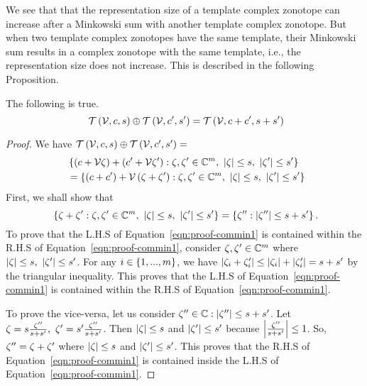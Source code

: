 %
We see that that the representation size of a template complex
zonotope can increase after a Minkowski sum with another template
complex zonotope.  But when two template complex
zonotopes have the same template, their Minkowski sum results in a
complex zonotope with the same template, i.e., the representation size
does not increase.  This is described in the following Proposition.
%
\begin{proposition}
The following is true.
%
\begin{equation}~\label{eqn:common-minkowski}
\mathit{\operatorname{\mathcal{T}}}\left(\mathcal{V},c,s\right)\oplus \mathit{\operatorname{\mathcal{T}}}\left(\mathcal{V},c^\prime,s^\prime\right)=\mathit{\operatorname{\mathcal{T}}}\left(\mathcal{V},c+c^\prime,s+s^\prime\right)
\end{equation}
%
\end{proposition}
%
\begin{proof}
We have $\mathit{\operatorname{\mathcal{T}}}\left(\mathcal{V},c,s\right)\oplus \mathit{\operatorname{\mathcal{T}}}\left(\mathcal{V},c^\prime,s^\prime\right)=$
%
\begin{align}~\label{eqn:proof-commin2}
&
\left\{\left(c+\mathcal{V}\zeta\right)+\left(c^\prime+\mathcal{V}\zeta^\prime\right):\zeta,\zeta^\prime\in\mathbb{C}^m,~\left|\zeta\right|\leq
s,~\left|\zeta^\prime\right|\leq s^\prime\right\}\nonumber\\
& = \left\{\left(c+c^\prime\right)+\mathcal{V}\left(\zeta+\zeta^\prime\right):\zeta,\zeta^\prime\in\mathbb{C}^m,~\left|\zeta\right|\leq
s,~\left|\zeta^\prime\right|\leq s^\prime\right\}
\end{align}
%
First, we shall show that
\begin{equation}~\label{eqn:proof-commin1}
\left\{\zeta+\zeta^\prime:\zeta,\zeta^\prime\in\mathbb{C}^m,~\left|\zeta\right|\leq
s,~\left|\zeta^\prime\right|\leq s^\prime\right\}=\left\{\zeta^{\prime\prime}:\left|\zeta^{\prime\prime}\right|\leq s+s^\prime \right\}.
\end{equation}
%
To prove that the L.H.S of Equation~\ref{eqn:proof-commin1} is
contained within the R.H.S of Equation~\ref{eqn:proof-commin1},
consider $\zeta,\zeta^\prime\in\mathbb{C}^m$ where $\left|\zeta\right|\leq
s,~\left|\zeta^\prime\right|\leq s^\prime$.  For any
$i\in\left\{1,...,m\right\}$, we have
$\left|\zeta_i+\zeta^\prime_i\right|\leq \left|\zeta_i\right|+\left|\zeta^\prime_i\right|=s+s^\prime$
by the triangular inequality.  This proves that the L.H.S of
Equation~\ref{eqn:proof-commin1} is contained within the R.H.S of
Equation~\ref{eqn:proof-commin1}.

To prove the vice-versa, let us
consider
$\zeta^{\prime\prime}\in\mathbb{C}:\left|\zeta^{\prime\prime}\right|\leq s+s^\prime$.
Let
$\zeta=s\frac{\zeta^{\prime\prime}}{s+s^\prime},~\zeta^\prime=s^\prime\frac{\zeta^{\prime\prime}}{s+s^\prime}$.
Then $\left|\zeta\right|\leq s$ and
$\left|\zeta^\prime\right|\leq s^\prime$ because
$\left|\frac{\zeta^{\prime\prime}}{s+s^\prime}\right|\leq 1$.  So,
$\zeta^{\prime\prime}=\zeta+\zeta^\prime$ where $\left|\zeta\right|\leq s$ and
$\left|\zeta^\prime\right|\leq s^\prime$.  This proves that the R.H.S of
Equation~\ref{eqn:proof-commin1}  is contained inside the L.H.S of
Equation~\ref{eqn:proof-commin1}.


\end{proof}
